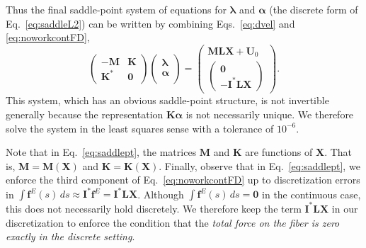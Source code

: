 Thus the final saddle-point system of equations for $\bm{\lambda}$ and $\bm{\alpha}$ (the discrete form of Eq.\ \eqref{eq:saddleL2}) can be written by combining Eqs.\ \eqref{eq:dvel} and \eqref{eq:noworkcontFD}, 
\begin{equation}
\label{eq:saddlept}
    \begin{pmatrix}
    -\bm{M} & \bm{K}\\[4 pt]
    \bm{K}^* & \bm{0}
    \end{pmatrix}
    \begin{pmatrix} 
    \bm{\lambda}\\[4 pt]
    \bm{\alpha}\\[4 pt]
    \end{pmatrix} =  \begin{pmatrix} 
    \bm{M}\bm{L}\bm{X}+\bm{U}_0\\[4 pt]
    \begin{pmatrix} \bm{0}\\[4 pt]
    -\bm{I}^* \bm{L}\bm{X} \end{pmatrix}
    \end{pmatrix}.
\end{equation}
This system, which has an obvious saddle-point structure, is not invertible generally because the representation $\bm{K}\bm{\alpha}$ is not necessarily unique. We therefore solve the system in the least squares sense with a tolerance of $10^{-6}$.

Note that in Eq.\ \eqref{eq:saddlept}, the matrices $\bm{M}$ and $\bm{K}$ are functions of $\bm{X}$. That is, $\bm{M}=\bm{M}(\bm{X})$ and $\bm{K}=\bm{K}(\bm{X})$. Finally, observe that in Eq.\ \eqref{eq:saddlept}, we enforce the third component of Eq.\ \eqref{eq:noworkcontFD} up to discretization errors in $\int \bm{f}^E(s) \, ds \approx \bm{I}^*\bm{f}^E=\bm{I}^*\bm{LX}$. Although $\int \bm{f}^E(s) \, ds=\bm{0}$ in the continuous case, this does not necessarily hold discretely. We therefore keep the term $\bm{I}^*\bm{LX}$ in our discretization to enforce the condition that the \textit{total force on the fiber is zero exactly in the discrete setting}.

